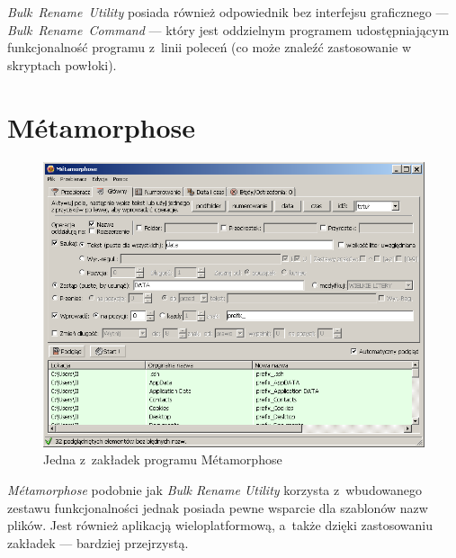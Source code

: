 \textit{Bulk~Rename~Utility} posiada również odpowiednik bez interfejsu graficznego --- \textit{Bulk~Rename~Command} --- który jest oddzielnym programem udostępniającym funkcjonalność programu z~linii poleceń (co może znaleźć zastosowanie w skryptach powłoki).

\section{Métamorphose}
\begin{figure}[h]
\begin{center}
\includegraphics[scale=0.75]{img/metamorphose_window.png}
\end{center}
\caption{Jedna z~zakładek programu Métamorphose}
\end{figure}

\par
\textit{Métamorphose} podobnie jak \textit{Bulk Rename Utility} korzysta z~wbudowanego zestawu funkcjonalności jednak posiada pewne wsparcie dla szablonów nazw plików. Jest również aplikacją wieloplatformową, a~także dzięki zastosowaniu zakładek --- bardziej przejrzystą.

